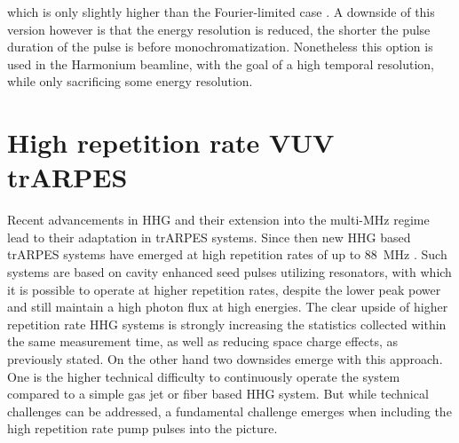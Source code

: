 which is only slightly higher than the Fourier-limited case \cite{poletto_time-preserving_2010,nugent-glandorf_laser-based_2002,poletto_time-compensated_2004,poletto_time-delay_2006}.
A downside of this version however is that the energy resolution is reduced, the shorter the pulse duration of the pulse is before monochromatization.
Nonetheless this option is used in the Harmonium beamline, with the goal of a high temporal resolution, while only sacrificing some energy resolution.

\section{High repetition rate VUV trARPES}
\label{sec:high_rep_vuv}

Recent advancements in HHG and their extension into the multi-\unit{\mega\hertz} regime \cite{mills_xuv_2012,hadrich_high_2014,pronin_high-power_2015,saraceno_toward_2015,hadrich_single-pass_2016,carstens_high-harmonic_2016,zhao_efficient_2018} lead to their adaptation in trARPES systems.
Since then new HHG based trARPES systems have emerged at high repetition rates of up to \qty{88}{\mega\hertz} \cite{corder_ultrafast_2018,mills_cavity-enhanced_2019}.
Such systems are based on cavity enhanced seed pulses utilizing resonators, with which it is possible to operate at higher repetition rates, despite the lower peak power and still maintain a high photon flux at high energies.
The clear upside of higher repetition rate HHG systems is strongly increasing the statistics collected within the same measurement time, as well as reducing space charge effects, as previously stated.
On the other hand two downsides emerge with this approach.
One is the higher technical difficulty to continuously operate the system compared to a simple gas jet or fiber based HHG system.
But while technical challenges can be addressed, a fundamental challenge emerges when including the high repetition rate pump pulses into the picture.

